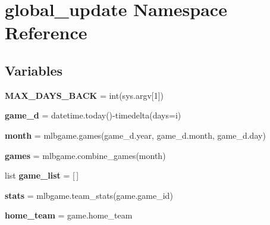 \hypertarget{namespaceglobal__update}{}\section{global\+\_\+update Namespace Reference}
\label{namespaceglobal__update}
\subsection*{Variables}
\begin{DoxyCompactItemize}
\item 
{\bfseries M\+A\+X\+\_\+\+D\+A\+Y\+S\+\_\+\+B\+A\+CK} = int(sys.\+argv\mbox{[}1\mbox{]})\hypertarget{namespaceglobal__update_a46c16b784d05e89aff8a0c222154d057}{}\label{namespaceglobal__update_a46c16b784d05e89aff8a0c222154d057}

\item 
{\bfseries game\+\_\+d} = datetime.\+today()-\/timedelta(days=i)\hypertarget{namespaceglobal__update_a54d39a4cedb5943fc96bad87a42ef0fd}{}\label{namespaceglobal__update_a54d39a4cedb5943fc96bad87a42ef0fd}

\item 
{\bfseries month} = mlbgame.\+games(game\+\_\+d.\+year, game\+\_\+d.\+month, game\+\_\+d.\+day)\hypertarget{namespaceglobal__update_afe8b6052b6c07523c53a501212b72dbd}{}\label{namespaceglobal__update_afe8b6052b6c07523c53a501212b72dbd}

\item 
{\bfseries games} = mlbgame.\+combine\+\_\+games(month)\hypertarget{namespaceglobal__update_a1d2daa63c82c9f2c434af5d767616d5e}{}\label{namespaceglobal__update_a1d2daa63c82c9f2c434af5d767616d5e}

\item 
list {\bfseries game\+\_\+list} = \mbox{[}$\,$\mbox{]}\hypertarget{namespaceglobal__update_a35b1331036d7d2c780a370363a6b71e5}{}\label{namespaceglobal__update_a35b1331036d7d2c780a370363a6b71e5}

\item 
{\bfseries stats} = mlbgame.\+team\+\_\+stats(game.\+game\+\_\+id)\hypertarget{namespaceglobal__update_a37364e0878f011a944c7fb2df5d2ff86}{}\label{namespaceglobal__update_a37364e0878f011a944c7fb2df5d2ff86}

\item 
{\bfseries home\+\_\+team} = game.\+home\+\_\+team\hypertarget{namespaceglobal__update_a3f485b0d2a8f5d1aaa4c433391800210}{}\label{namespaceglobal__update_a3f485b0d2a8f5d1aaa4c433391800210}


\end{DoxyCompactItemize}
